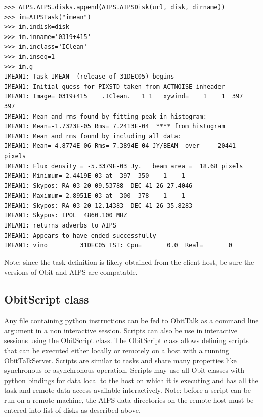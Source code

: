 \documentclass[11pt]{report}
\begin{document}
\begin{verbatim}
>>> AIPS.AIPS.disks.append(AIPS.AIPSDisk(url, disk, dirname))
>>> im=AIPSTask("imean")
>>> im.indisk=disk
>>> im.inname='0319+415'
>>> im.inclass='IClean'
>>> im.inseq=1
>>> im.g
IMEAN1: Task IMEAN  (release of 31DEC05) begins
IMEAN1: Initial guess for PIXSTD taken from ACTNOISE inheader
IMEAN1: Image= 0319+415    .IClean.   1 1   xywind=    1    1  397  397
IMEAN1: Mean and rms found by fitting peak in histogram:
IMEAN1: Mean=-1.7323E-05 Rms= 7.2413E-04  **** from histogram
IMEAN1: Mean and rms found by including all data:
IMEAN1: Mean=-4.8774E-06 Rms= 7.3894E-04 JY/BEAM  over     20441 pixels
IMEAN1: Flux density = -5.3379E-03 Jy.   beam area =  18.68 pixels
IMEAN1: Minimum=-2.4419E-03 at  397  350    1    1
IMEAN1: Skypos: RA 03 20 09.53788  DEC 41 26 27.4046
IMEAN1: Maximum= 2.8951E-03 at  300  378    1    1
IMEAN1: Skypos: RA 03 20 12.14383  DEC 41 26 35.8283
IMEAN1: Skypos: IPOL  4860.100 MHZ
IMEAN1: returns adverbs to AIPS
IMEAN1: Appears to have ended successfully
IMEAN1: vino         31DEC05 TST: Cpu=       0.0  Real=       0
\end{verbatim}


Note: since the task definition is likely  obtained from the client host, be
sure the versions of Obit and AIPS are compatable.

\subsection{ObitScript class\label{ObitScript}}
Any file containing python instructions can be fed to ObitTalk as a
command line argument in a non interactive session.
Scripts can also be use in interactive sessions using the ObitScript class.
The ObitScript class allows defining scripts that can be executed
either locally or remotely on a host with a running ObitTalkServer.
Scripts are similar to tasks and share many properties like
synchronous or asynchronous operation.
Scripts may use all Obit classes with python bindings for data local
to the host on which it is executing and has all the task and remote
data access available interactively.
Note: before a script can be run on a remote machine, the AIPS data directories 
on the remote host must be entered into list of disks as described above.
\end{document}

